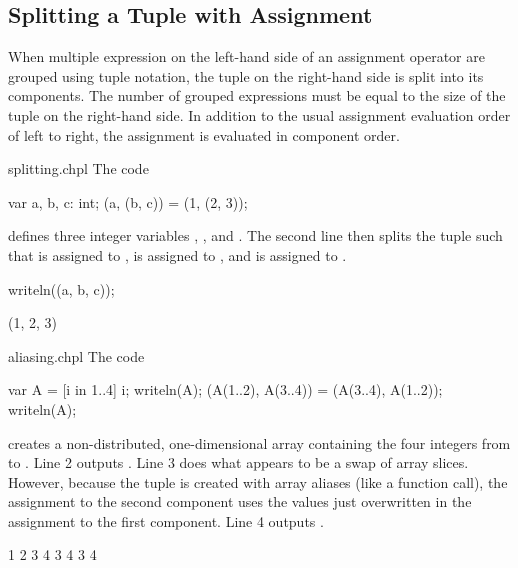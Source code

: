 \subsection{Splitting a Tuple with Assignment}
\label{Assignments_in_a_Tuple}

When multiple expression on the left-hand side of an assignment
operator are grouped using tuple notation, the tuple on the right-hand
side is split into its components.  The number of grouped expressions
must be equal to the size of the tuple on the right-hand side.  In
addition to the usual assignment evaluation order of left to right,
the assignment is evaluated in component order.

\begin{chapelexample}{splitting.chpl}
The code
\begin{chapel}
var a, b, c: int;
(a, (b, c)) = (1, (2, 3));
\end{chapel}
defines three integer variables , , and .  The
second line then splits the tuple  such that 
is assigned to ,  is assigned to ,
and  is assigned to .
\begin{chapelpost}
writeln((a, b, c));
\end{chapelpost}
\begin{chapeloutput}
(1, 2, 3)
\end{chapeloutput}
\end{chapelexample}

\begin{chapelexample}{aliasing.chpl}
The code
\begin{chapel}
var A = [i in 1..4] i;
writeln(A);
(A(1..2), A(3..4)) = (A(3..4), A(1..2));
writeln(A);
\end{chapel}
creates a non-distributed, one-dimensional array containing the four
integers from  to .  Line 2 outputs .
Line 3 does what appears to be a swap of array slices.  However,
because the tuple is created with array aliases (like a function
call), the assignment to the second component uses the values just
overwritten in the assignment to the first component.  Line 4
outputs .
\begin{chapelpost}
\end{chapelpost}
\begin{chapeloutput}
1 2 3 4
3 4 3 4
\end{chapeloutput}
\end{chapelexample}

